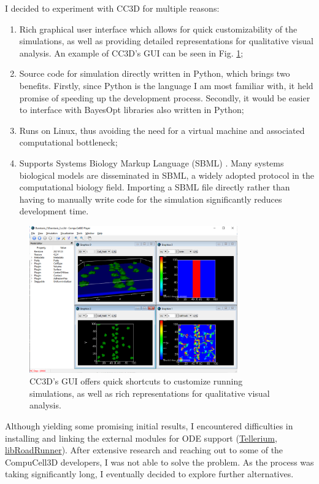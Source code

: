 \documentclass[bsc,frontabs,singlespacing,parskip,deptreport]{infthesis}
\begin{document}
I decided to experiment with CC3D for multiple reasons:

\begin{enumerate}
    \item Rich graphical user interface  which allows for quick customizability of the simulations, as well as providing detailed representations for qualitative visual analysis. An example of CC3D's GUI can be seen in Fig. \ref{fig:CC3D};
    \item Source code for simulation directly written in Python, which brings two benefits. Firstly, since Python is the language I am most familiar with, it held promise of speeding up the development process. Secondly, it would be easier to interface with BayesOpt libraries also written in Python;
    \item Runs on Linux, thus avoiding the need for a virtual machine and associated computational bottleneck;
    \item Supports Systems Biology Markup Language (SBML) \cite{pmid31219795}. Many systems biological models are disseminated in SBML, a widely adopted protocol in the computational biology field. Importing a SBML file directly rather than having to manually write code for the simulation significantly reduces development time.
\end{enumerate}

\begin{figure}
    \centering
    \includegraphics[width=0.8\textwidth]{Images/Other/CC3D.pdf}
    \caption{CC3D's GUI offers quick shortcuts to customize running simulations, as well as rich representations for qualitative visual analysis.}
    \label{fig:CC3D}
\end{figure}

Although yielding some promising initial results, I encountered difficulties in installing and linking the external modules for ODE support (\href{https://tellurium.analogmachine.org/}{Tellerium}, \href{http://libroadrunner.org/}{libRoadRunner}). After extensive research and reaching out to some of the CompuCell3D developers, I was not able to solve the problem. As the process was taking significantly long, I eventually decided to explore further alternatives.
\end{document}
